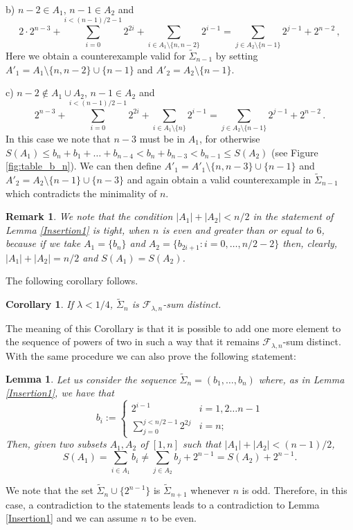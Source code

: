 \documentclass[a4paper]{amsart}
\theoremstyle{plain}
\newtheorem{Remark}[Definition]{Remark}
\newtheorem{Lemma}[Definition]{Lemma}
\newtheorem{Corollary}[Definition]{Corollary}
\begin{document}
b) $n-2 \in A_1$, $n-1\in A_2$ and
\begin{equation*}2\cdot 2^{n-3} + \sum_{i=0}^{ i<(n-1)/2-1} 2^{2i} +\sum_{i\in A_1\setminus \{n, n-2\}} 2^{i-1}=\sum_{j\in A_2\setminus \{n-1\}}2^{j-1} + 2^{n-2} \,,
\end{equation*}
Here we obtain a counterexample valid for $\widetilde{\Sigma}_{n-1}$ by setting $A'_1=A_1\setminus \{n, n-2\}\cup\{n-1\}$ and $A'_2=A_2\setminus \{n-1\}$.

c) $n-2 \notin A_1\cup A_2$, $n-1\in A_2$ and
\begin{equation*} 2^{n-3} + \sum_{i=0}^{ i< (n-1)/2-1} 2^{2i} +\sum_{i\in A_1\setminus \{n\}} 2^{i-1}=\sum_{j\in A_2\setminus \{n-1\}}2^{j-1} + 2^{n-2} \,.
\end{equation*}
In this case we note that $n-3$ must be in $A_1$, for otherwise $S(A_1)\leq b_n+b_1+\ldots + b_{n-4}<b_n+b_{n-3}<b_{n-1}\leq S(A_2)$ (see Figure \ref{fig:table_b_n}). We can then define $A'_1=A'_1\setminus\{n,n-3\}\cup\{n-1\}$ and $A'_2=A_2\setminus\{n-1\}\cup\{n-3\}$ and again obtain a valid counterexample in $\widetilde{\Sigma}_{n-1}$ which contradicts the minimality of $n$.
\endproof

\begin{Remark}
We note that the condition $|A_1| + |A_2| < n/2$ in the statement of Lemma \ref{Insertion1} is tight, when $n$ is even and greater than or equal to $6$,  because if we take $A_1 = \{b_n\}$ and $A_2 = \{b_{2i+1}:  i=0, \ldots, n/2 - 2\}$  then,  clearly,  $|A_1|+|A_2| = n/2$ and ${S(A_1) = S(A_2)}$.
\end{Remark}

The following corollary follows.
\begin{Corollary}
If $\lambda< 1/4$, $\widetilde{\Sigma}_n$ is $\mathcal{F}_{\lambda,n}$-sum distinct.
\end{Corollary}
The meaning of this Corollary is that it is possible to add one more element to the sequence of powers of two in such a way that it remains $\mathcal{F}_{\lambda,n}$-sum distinct. With the same procedure we can also prove the following statement:
\begin{Lemma}\label{Insertion2}
Let us consider the sequence $\widetilde{\Sigma}_{n}=(b_1,\dots,b_n)$ where, as in Lemma \ref{Insertion1}, we have that
$$b_i:=\begin{cases}
2^{i-1} & i=1,2\dots n-1\\
\sum_{j=0}^{j<n/2-1} 2^{2j} & i=n;
\end{cases}$$
Then, given two subsets $A_1,A_2$ of $[1,n]$ such that $|A_1|+|A_2|< (n-1)/2$,
$$S(A_1)=\sum_{i\in A_1} b_i\not=\sum_{j\in A_2} b_j+2^{n-1}=S(A_2)+2^{n-1}.$$
\end{Lemma}
\proof
We note that the set $\widetilde{\Sigma}_{n}\cup \{2^{n-1}\}$ is $\widetilde{\Sigma}_{n+1}$ whenever $n$ is odd. Therefore, in this case, a contradiction to the statements leads to a contradiction to Lemma \ref{Insertion1} and we can assume $n$ to be even. 
\end{document}
